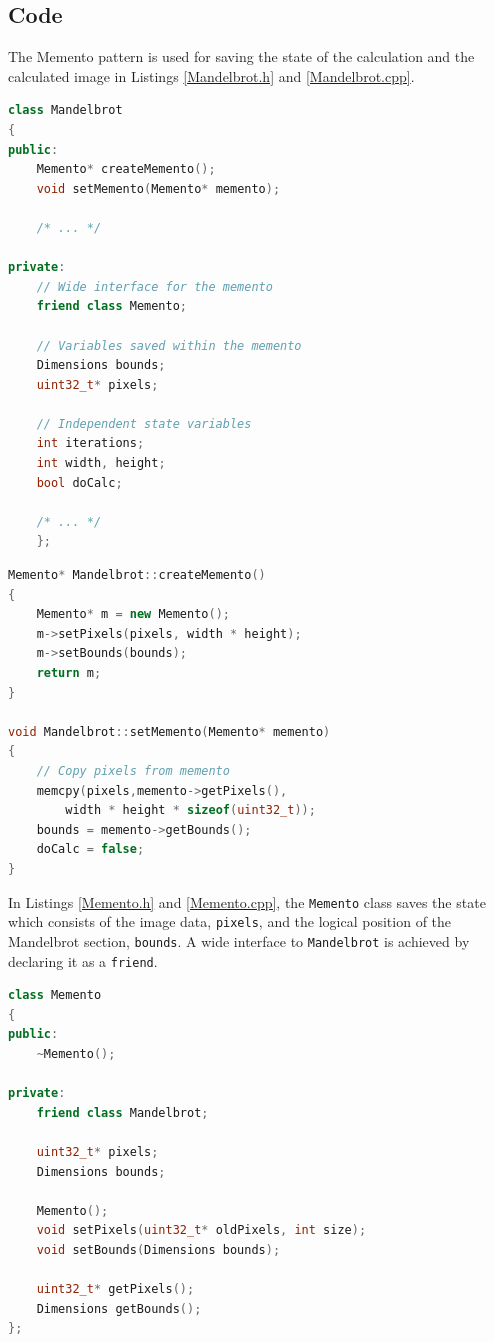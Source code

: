 \documentclass[11pt, a4paper, twoside]{article}
\begin{document}
	\subsection{Code}
	\label{subsec:code}
	The Memento pattern is used for saving the state of the calculation and the calculated image in Listings \ref{Mandelbrot.h} and \ref{Mandelbrot.cpp}.
	
	\begin{lstlisting}[language=c++, caption={Mandelbrot.h}, label={Mandelbrot.h}]
class Mandelbrot
{
public:
	Memento* createMemento();
	void setMemento(Memento* memento);
	
	/* ... */
	
private:
	// Wide interface for the memento
	friend class Memento;
	
	// Variables saved within the memento
	Dimensions bounds;
	uint32_t* pixels;
	
	// Independent state variables
	int iterations;
	int width, height;
	bool doCalc;
	
	/* ... */
	};
	\end{lstlisting}
	
	\begin{lstlisting}[language=c++, caption={Mandelbrot.cpp}, label={Mandelbrot.cpp}]
Memento* Mandelbrot::createMemento()
{
	Memento* m = new Memento();
	m->setPixels(pixels, width * height);
	m->setBounds(bounds);
	return m;
}

void Mandelbrot::setMemento(Memento* memento)
{
	// Copy pixels from memento
	memcpy(pixels,memento->getPixels(),
		width * height * sizeof(uint32_t));
	bounds = memento->getBounds();
	doCalc = false;
}
	\end{lstlisting}
	
	In Listings \ref{Memento.h} and \ref{Memento.cpp}, the \verb|Memento| class saves the state which consists of the image data, \verb|pixels|, and the logical position of the Mandelbrot section, \verb|bounds|. A wide interface to \verb|Mandelbrot| is achieved by declaring it as a \verb|friend|.
	
	\begin{lstlisting}[language=c++, caption={Memento.h}, label={Memento.h}]
class Memento
{
public:
	~Memento();
	
private:
	friend class Mandelbrot;
	
	uint32_t* pixels;
	Dimensions bounds;
	
	Memento();
	void setPixels(uint32_t* oldPixels, int size);
	void setBounds(Dimensions bounds);
	
	uint32_t* getPixels();
	Dimensions getBounds();
};
	\end{lstlisting}
	
\end{document}
